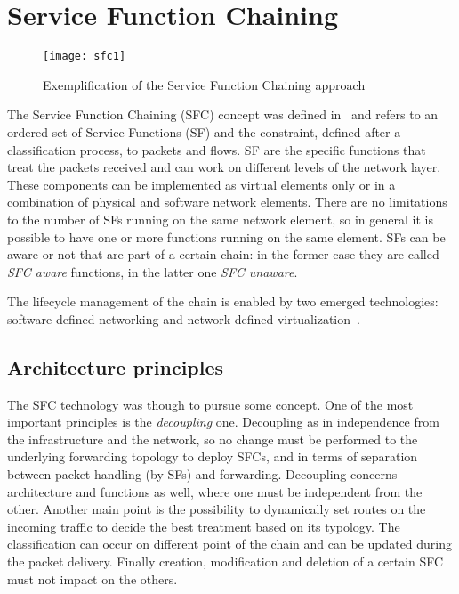 \section{Service Function Chaining}
\begin{figure}
  \centering
  \texttt{[image: sfc1]}
  \caption{Exemplification of the Service Function Chaining approach}
  \label{chap:background:img:sfc}
\end{figure}

The Service Function Chaining (SFC) concept was defined
in~\cite{halpern2015service} and refers to an ordered set of Service Functions
(SF) and the constraint, defined after a classification process, to packets and
flows. SF are the specific functions that treat the
packets received and can work on different levels of the network layer. These
components can be implemented as virtual elements only or in a combination of
physical and software network elements. There are no limitations to the number
of SFs running on the same network element, so in general it is possible to have
one or more functions running on the same element. SFs can be aware or not that
are part of a certain chain: in the former case they are called \emph{SFC aware}
functions, in the latter one \emph{SFC unaware}.

The lifecycle management of the chain is enabled by two emerged technologies:
software defined networking and network defined
virtualization~\cite{medhat2017service}.

\subsection{Architecture principles}
The SFC technology was though to pursue some concept. One of the most important
principles is the \emph{decoupling} one. Decoupling as in independence from the
infrastructure and the network, so no change must be performed to the
underlying forwarding topology to deploy SFCs, and in terms of separation
between packet handling (by SFs) and forwarding. Decoupling concerns
architecture and functions as well, where one must be independent from the
other. Another main point is the possibility to dynamically set routes on the
incoming traffic to decide the best treatment based on its typology. The
classification can occur on different point of the chain and can be updated
during the packet delivery. Finally creation, modification and deletion of a
certain SFC must not impact on the others.

